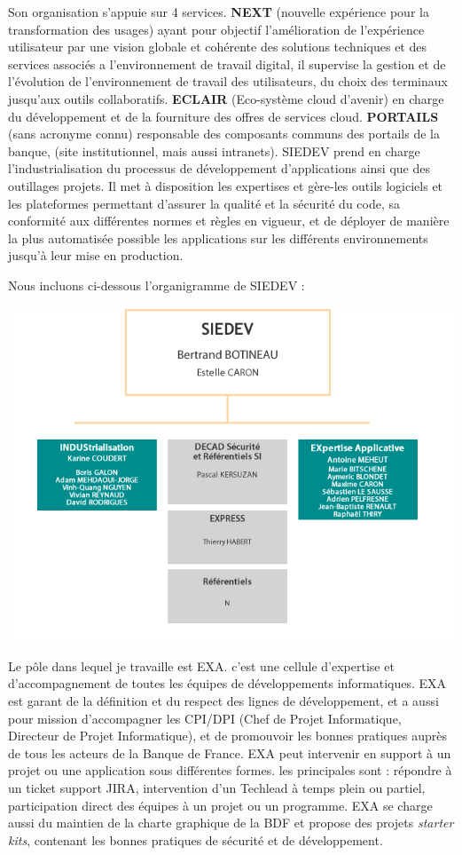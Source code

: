 \documentclass{report}
\begin{document}
Son organisation s'appuie sur 4 services.
\textbf{NEXT} (nouvelle expérience pour la transformation des usages) ayant pour objectif l'amélioration de l'expérience utilisateur par une vision globale et cohérente des solutions techniques et des services associés a l'environnement de travail digital, il supervise la gestion et de l'évolution de l'environnement de travail des utilisateurs, du choix des terminaux jusqu'aux outils collaboratifs.
\textbf{ECLAIR} (Eco-système cloud d'avenir) en charge du développement et de la fourniture des offres de services cloud.
\textbf{PORTAILS} (sans acronyme connu) responsable des composants communs des portails de la banque, (site institutionnel, mais aussi intranets).
SIEDEV prend en charge l'industrialisation du processus de développement d'applications ainsi que des outillages projets. Il met à disposition les expertises et gère-les outils logiciels et les plateformes permettant d'assurer la qualité et la sécurité du code, sa conformité aux différentes normes et règles en vigueur, et de déployer de manière la plus automatisée possible les applications sur les différents environnements jusqu'à leur mise en production.

Nous incluons ci-dessous l'organigramme de SIEDEV :

\begin{center}
   \includegraphics[scale=0.70]{SIEDEV} 
\end{center}

Le pôle dans lequel je travaille est EXA. c'est une cellule d'expertise et d'accompagnement de toutes les équipes de développements informatiques. EXA est garant de la définition et du respect des lignes de développement, et a aussi pour mission d'accompagner les CPI/DPI (Chef de Projet Informatique, Directeur de Projet Informatique), et de promouvoir les bonnes pratiques auprès de tous les acteurs de la Banque de France. EXA peut intervenir en support à un projet ou une application sous différentes formes. les principales sont : répondre à un ticket support JIRA, intervention d'un Techlead à temps plein ou partiel, participation direct des équipes à un projet ou un programme. EXA se charge aussi du maintien de la charte graphique de la BDF et propose des projets \textit{starter kits}, contenant les bonnes pratiques de sécurité et de développement.
\end{document}
